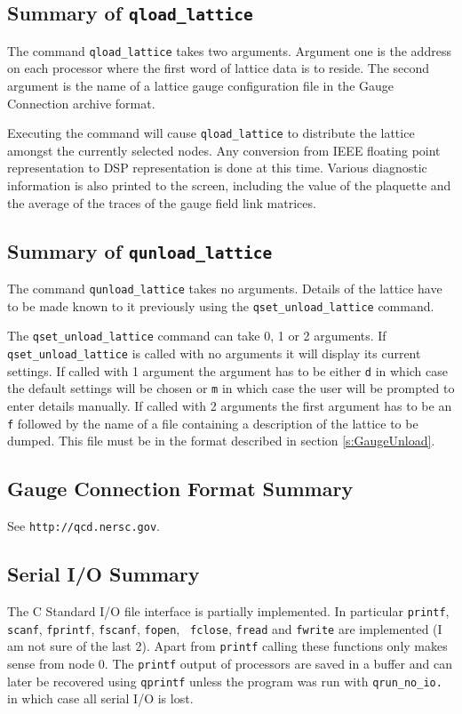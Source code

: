 \subsection{Summary of {\tt qload\_lattice}}
The command {\tt qload\_lattice} takes two arguments. Argument one
is the address on each processor where the first word of lattice data
is to reside. The second argument is the name of a lattice gauge configuration
file in the Gauge Connection archive format. 

Executing the command will cause {\tt qload\_lattice} to distribute the 
lattice amongst the currently selected nodes. Any conversion from 
IEEE floating point representation to DSP representation is done at this time.
Various diagnostic information is also printed to the screen, including the
value of the plaquette and the average of the traces of the gauge field 
link matrices.

\subsection{Summary of {\tt qunload\_lattice}}
The command {\tt qunload\_lattice} takes no arguments. Details of the lattice
have to be made known to it previously using the {\tt qset\_unload\_lattice} 
command.

The {\tt qset\_unload\_lattice} command can take 0, 1 or 2 arguments.
If {\tt qset\_unload\_lattice} is called with no arguments it will display
its current settings. If called with 1 argument the argument has to be 
either {\tt d} in which case the default settings will be chosen or {\tt m}
in which case the user will be prompted to enter details manually. If called
with 2 arguments the first argument has to be an {\tt f} followed by the name
of a file containing a description of the lattice to be dumped. This file
must be in the format described in section \ref{s:GaugeUnload}.

\subsection{Gauge Connection Format Summary}
See {\tt http://qcd.nersc.gov}.

\subsection{Serial I/O Summary}
The C Standard I/O file interface is partially implemented. In particular
{\tt printf}, {\tt scanf}, {\tt fprintf}, {\tt fscanf}, {\tt fopen}, {\tt
fclose}, {\tt fread} and {\tt fwrite} are implemented (I am not sure of the
last 2). Apart from {\tt printf} calling these functions only makes sense
from node 0. The {\tt printf} output of processors are saved in a buffer
and can later be recovered using {\tt qprintf} unless the program was run
with {\tt qrun\_no\_io.} in which case all serial I/O is lost.

